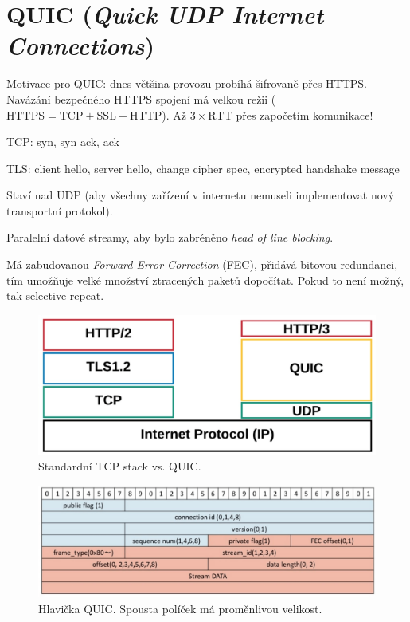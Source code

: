 
\section{QUIC (\textit{Quick UDP Internet Connections})}

\begin{compactitem}
    \item Motivace pro QUIC: dnes většina provozu probíhá šifrovaně přes HTTPS. Navázání bezpečného HTTPS spojení má velkou režii ($\text{HTTPS} = \text{TCP} + \text{SSL} + \text{HTTP}$). Až $3 \times \text{RTT}$ přes započetím komunikace! \begin{compactitem}
        \item TCP: syn, syn ack, ack
        \item TLS: client hello, server hello, change cipher spec, encrypted handshake message
    \end{compactitem}
    \item Staví nad UDP (aby všechny zařízení v internetu nemuseli implementovat nový transportní protokol).
    \item Paralelní datové streamy, aby bylo zabréněno \textit{head of line blocking}.
    \item Má zabudovanou \textit{Forward Error Correction} (FEC), přidává bitovou redundanci, tím umožňuje velké množství ztracených paketů dopočítat. Pokud to není možný, tak  selective repeat.
\end{compactitem}

\begin{figure}[H]
    \centering
    \includegraphics[width=0.6\linewidth]{quic_1.png}
    \caption{Standardní TCP stack vs. QUIC.}
\end{figure}

\begin{figure}[H]
    \centering
    \includegraphics[width=1\linewidth]{quic_header.png}
    \caption{Hlavička QUIC. Spousta políček má proměnlivou velikost.}
\end{figure}

